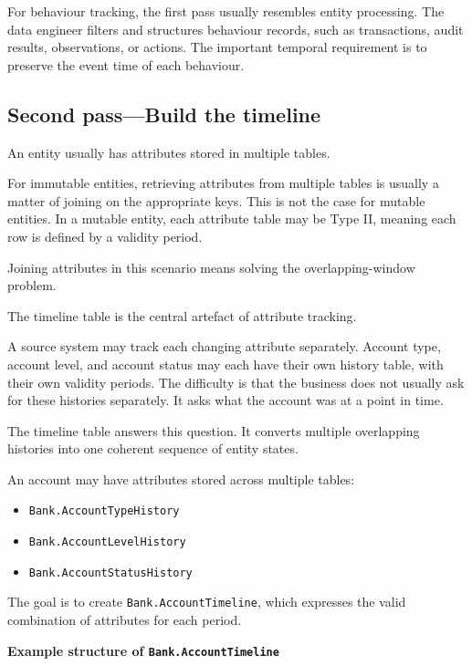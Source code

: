 \documentclass[10pt,openany,10pt]{book}
\providecommand{\tightlist}{%
  \setlength{\itemsep}{0pt}\setlength{\parskip}{0pt}}
\begin{document}
For behaviour tracking, the first pass usually resembles entity
processing. The data engineer filters and structures behaviour records,
such as transactions, audit results, observations, or actions. The
important temporal requirement is to preserve the event time of each
behaviour.

\subsection{Second pass---Build the
timeline}\label{second-passbuild-the-timeline}

An entity usually has attributes stored in multiple tables.

For immutable entities, retrieving attributes from multiple tables is
usually a matter of joining on the appropriate keys. This is not the
case for mutable entities. In a mutable entity, each attribute table may
be Type II, meaning each row is defined by a validity period.

Joining attributes in this scenario means solving the overlapping-window
problem.

The timeline table is the central artefact of attribute tracking.

A source system may track each changing attribute separately. Account
type, account level, and account status may each have their own history
table, with their own validity periods. The difficulty is that the
business does not usually ask for these histories separately. It asks
what the account was at a point in time.

The timeline table answers this question. It converts multiple
overlapping histories into one coherent sequence of entity states.

An account may have attributes stored across multiple tables:

\begin{itemize}
\tightlist
\item
  \texttt{Bank.AccountTypeHistory}
\item
  \texttt{Bank.AccountLevelHistory}
\item
  \texttt{Bank.AccountStatusHistory}
\end{itemize}

The goal is to create \texttt{Bank.AccountTimeline}, which expresses the
valid combination of attributes for each period.

\textbf{Example structure of \texttt{Bank.AccountTimeline}}
\end{document}
